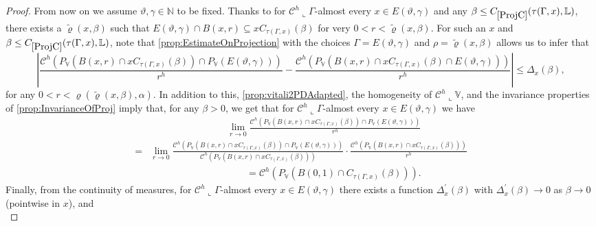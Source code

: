 \documentclass[10pt, a4paper,
oneside, headinclude,footinclude]{scrartcl}
\begin{document}
\begin{proof}
From now on we assume $\vartheta,\gamma\in\mathbb N$ to be fixed. Thanks to \cite[Proposition 3.2]{antonelli2020rectifiable} for $\mathcal{C}^h\llcorner\Gamma$-almost every $x\in E(\vartheta,\gamma)$ and any $\beta\leq\oldC{ProjC}(\tau(\Gamma,x),\mathbb L)$, there exists a $\tilde\varrho(x,\beta)$ such that $E(\vartheta,\gamma)\cap B(x,r)\subseteq xC_{\tau(\Gamma,x)}(\beta)$ for very $0<r<\widetilde\varrho(x,\beta)$. For such an $x$ and $\beta\leq\oldC{ProjC}(\tau(\Gamma,x),\mathbb L)$, note that \cref{prop:EstimateOnProjection} with the choices $\Gamma=E(\vartheta,\gamma)$ and $\rho=\tilde\varrho(x,\beta)$ allows us to infer that
\begin{equation}\label{eqn:CrucialLimit3}
\left|\frac{\mathcal{C}^h(P_{\mathbb V}(B(x,r)\cap xC_{\tau(\Gamma,x)}(\beta))\cap P_{\mathbb V}(E(\vartheta,\gamma)))}{r^h}-\frac{\mathcal{C}^h(P_{\mathbb V}(B(x,r)\cap xC_{\tau(\Gamma,x)}(\beta)\cap E(\vartheta,\gamma)))}{r^h}\right|\leq \Delta_x (\beta),
\end{equation}
for any $0<r<\varrho(\tilde\varrho(x,\beta),\alpha)$. In addition to this, \cref{prop:vitali2PDAdapted}, the homogeneity of $\mathcal{C}^h\llcorner\mathbb V$, and the invariance properties of \cref{prop:InvarianceOfProj} imply that, for any $\beta>0$, we get that for $\mathcal{C}^h\llcorner\Gamma$-almost every $x\in E(\vartheta,\gamma)$ we have
\begin{equation}\label{eq:limite}
    \begin{split}
        &     \qquad\qquad\qquad\qquad\lim_{r\to 0}\frac{\mathcal{C}^h(P_{\mathbb V}(B(x,r)\cap xC_{\tau(\Gamma,x)}(\beta))\cap P_{\mathbb V}(E(\vartheta,\gamma)))}{r^h}\\
        =&\lim_{r\to 0}\frac{\mathcal{C}^h(P_{\mathbb V}(B(x,r)\cap xC_{\tau(\Gamma,x)}(\beta))\cap P_{\mathbb V}(E(\vartheta,\gamma)))}{\mathcal{C}^h(P_{\mathbb V}(B(x,r)\cap xC_{\tau(\Gamma,x)}(\beta)))} 
        \cdot\frac{\mathcal C^h(P_{\mathbb V}(B(x,r)\cap xC_{\tau(\Gamma,x)}(\beta)))}{r^h}\\ &\qquad\qquad\qquad\qquad\qquad=\mathcal{C}^h(P_{\mathbb V}(B(0,1)\cap C_{\tau(\Gamma,x)}(\beta))).
    \end{split}
\end{equation}
Finally, from the continuity of measures, for $\mathcal{C}^h\llcorner\Gamma$-almost every $x\in E(\vartheta,\gamma)$ there exists a function $\Delta^\prime_x(\beta)$ with $\Delta^\prime_x(\beta)\to 0$ as $\beta\to 0$ (pointwise in $x$), and
\begin{equation}\label{eqn:CrucialLimit2}

\end{equation}
\end{proof}
\end{document}
